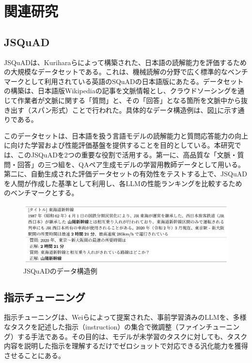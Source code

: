 \documentclass[twocolumn]{jsarticle}
\begin{document}
\section{関連研究}

\subsection{JSQuAD}
JSQuADは、Kuriharaら\cite{JGLUE}によって構築された、日本語の読解能力を評価するための大規模なデータセットである。これは、機械読解の分野で広く標準的なベンチマークとして利用されている英語のSQuAD\cite{SQuAD}の日本語版にあたる。データセットの構築は、日本語版Wikipediaの記事を文脈情報とし、クラウドソーシングを通じて作業者が文脈に関する「質問」と、その「回答」となる箇所を文脈中から抜き出す（スパン形式）ことで行われた。具体的なデータ構造例は、図\ref{fig:jsquad_example}に示す通りである。

このデータセットは、日本語を扱う言語モデルの読解能力と質問応答能力の向上に向けた学習および性能評価基盤を提供することを目的としている。本研究では、このJSQuADを2つの重要な役割で活用する。第一に、高品質な「文脈・質問・回答」の三つ組を、QAペア生成モデルの学習用教師データとして用いる。第二に、自動生成された評価データセットの有効性をテストする上で、JSQuADを人間が作成した基準として利用し、各LLMの性能ランキングを比較するためのベンチマークとする。

\begin{figure}[t]
  \centering
  \includegraphics[width=\linewidth]{fig/jsquad.png}
  \caption{JSQuADのデータ構造例\cite{JGLUE}}
  \label{fig:jsquad_example}
\end{figure}

\subsection{指示チューニング}
指示チューニングは、Weiら\cite{Instruction-Tuning}によって提案された、事前学習済みのLLMを、多様なタスクを記述した指示（instruction）の集合で微調整（ファインチューニング）する手法である。その目的は、モデルが未学習のタスクに対しても、タスク内容を説明した指示を理解するだけでゼロショット\cite{Instruction-Tuning}で対応できる汎化能力を獲得させることにある。
\end{document}
